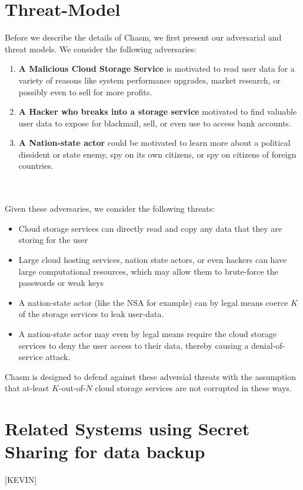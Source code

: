 \documentclass[letterpaper,twocolumn,10pt]{article}
\begin{document}
\section{Threat-Model}
Before we describe the details of Chasm, we first present our adversarial and threat models. We consider the following adversaries:
\begin{enumerate}

	\item {\bf A Malicious Cloud Storage Service} is motivated to read user data for a variety of reasons like system performance upgrades, market research, or possibly even to sell for more profits.

	\item {\bf A Hacker who breaks into a storage service} motivated to find valuable user data to expose for blackmail, sell, or even use to access bank accounts.

	\item {\bf A Nation-state actor} could be motivated to learn more about a political dissident or state enemy, spy on its own citizens, or spy on citizens of foreign countries.
\end{enumerate}
\\\\
Given these adversaries, we consider the following threats:
\begin{itemize}
	\item Cloud storage services can directly read and copy any data that they are storing for the user
	\item Large cloud hosting services, nation state actors, or even hackers can have large computational resources, which may allow them to brute-force the passwords or weak keys
	\item A nation-state actor (like the NSA for example) can by legal means coerce $K$ of the storage services to leak user-data.
	\item A nation-state actor may even by legal means require the cloud storage services to deny the user access to their data, thereby causing a denial-of-service attack.

\end{itemize}
Chasm is designed to defend against these adversial threats with the assumption that at-least $K$-out-of-$N$ cloud storage services are not corrupted in these ways.

\section{Related Systems using Secret Sharing for data backup}
[KEVIN]
\end{document}

